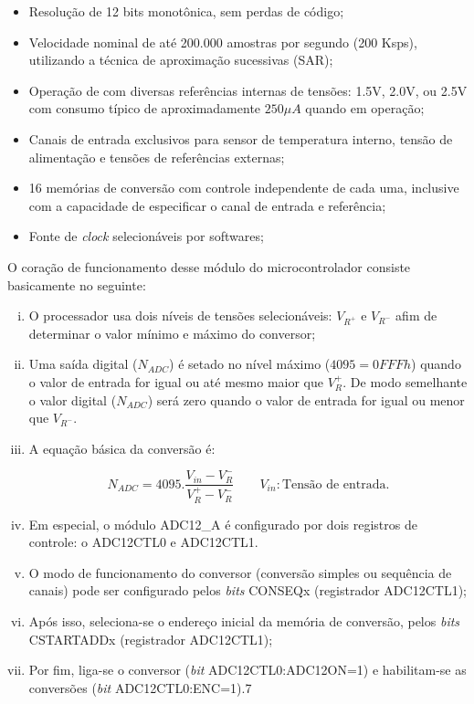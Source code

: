 		
		\begin{itemize}
			\item Resolução de 12 bits monotônica, sem perdas de código;
			\item Velocidade nominal de até 200.000 amostras por segundo (200 Ksps), utilizando a técnica de aproximação sucessivas (SAR);
			\item Operação de com diversas referências internas de tensões: 1.5V, 2.0V, ou 2.5V com consumo típico de aproximadamente $250\mu A$ quando em operação;
			\item Canais de entrada exclusivos para sensor de temperatura interno, tensão de alimentação e tensões de referências externas;
			\item 16 memórias de conversão com controle independente de cada uma, inclusive com a capacidade de especificar o canal de entrada e referência;
			\item Fonte de \textit{clock} selecionáveis por softwares;
		\end{itemize}
	
		O coração de funcionamento desse módulo do microcontrolador consiste basicamente no seguinte:
		
			\begin{enumerate}[(i)]
				\item O processador usa dois níveis de tensões selecionáveis: $V_{R^{+}} $ e $ V_{R^{-}} $ afim de determinar o valor mínimo e máximo do conversor;
				\item Uma saída digital ($ N_{ADC} $) é setado no nível máximo ($ 4095 = 0FFFh $) quando o valor de entrada for igual ou até mesmo maior que $ V_R^+ $. De modo semelhante o valor digital ($ N_{ADC} $) será zero quando o valor de entrada for igual ou menor que $ V_{R^-} $.
				\item A equação básica da conversão é:
				
				\begin{equation}
					\label{eq-adc12-formula}
					N_{ADC} = 4095.\frac{V_{in}-V_R^-}{V_R^+ - V_R^-}
					\qquad
					V_{in}: \text{Tensão de entrada}.
				\end{equation}
				\item Em especial, o módulo ADC12\_A é configurado por dois registros de controle: o ADC12CTL0 e ADC12CTL1.
				\item  O modo de funcionamento do conversor (conversão simples ou sequência de canais) pode ser configurado pelos \textit{bits} CONSEQx (registrador ADC12CTL1);
				\item Após isso, seleciona-se o endereço inicial da memória de conversão, pelos \textit{bits} CSTARTADDx (registrador ADC12CTL1);
				\item Por fim, liga-se o conversor (\textit{bit} ADC12CTL0:ADC12ON=1) e habilitam-se as conversões (\textit{bit} ADC12CTL0:ENC=1).7
			\end{enumerate}
	
